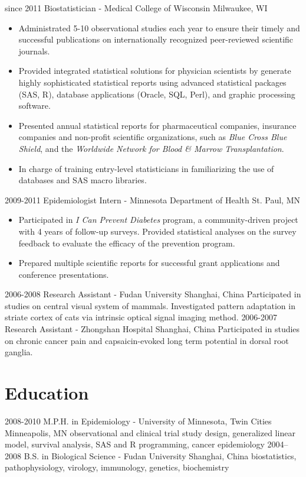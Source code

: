 \documentclass[11pt, print]{friggeri-cv}
\begin{document}
\begin{entrylist}
  \entry
    {since 2011}
    {Biostatistician - Medical College of Wisconsin}
    {Milwaukee, WI}
    {
    \vspace{-\baselineskip}
    \begin{itemize}
      \item Administrated 5-10 observational studies each year to ensure their timely and successful publications on internationally recognized peer-reviewed scientific journals.
      \item Provided integrated statistical solutions for physician scientists by generate highly sophisticated statistical reports using advanced statistical packages (SAS, R), database applications (Oracle, SQL, Perl), and graphic processing software.
      \item Presented annual statistical reports for pharmaceutical companies, insurance companies and non-profit scientific organizations, such as \textit{Blue Cross Blue Shield}, and the \textit{Worldwide Network for Blood \& Marrow Transplantation}.
      \item In charge of training entry-level statisticians in familiarizing the use of databases and SAS macro libraries.
    \end{itemize}
    }
  \entry
    {2009-2011}
    {Epidemiologist Intern - Minnesota Department of Health}
    {St. Paul, MN}
    {
    \vspace{-\baselineskip}
    \begin{itemize}
      \item Participated in \textit{I Can Prevent Diabetes} program, a community-driven project with 4 years of follow-up surveys. Provided statistical analyses on the survey feedback to evaluate the efficacy of the prevention program.
      \item Prepared multiple scientific reports for successful grant applications and conference presentations.
    \end{itemize}
    }
  \entry
    {2006-2008}
    {Research Assistant - Fudan University}
    {Shanghai, China}
    {Participated in studies on central visual system of mammals. Investigated pattern adaptation in striate cortex of cats via intrinsic optical signal imaging method.}
  \entry
    {2006-2007}
    {Research Assistant - Zhongshan Hospital}
    {Shanghai, China }
    {Participated in studies on chronic cancer pain and capsaicin-evoked long term potential in dorsal root ganglia.}
\end{entrylist}

\section{Education}

\begin{entrylist}
  \entry
    {2008-2010}
    {M.P.H. in Epidemiology - University of Minnesota, Twin Cities}
    {Minneapolis, MN}
    {observational and clinical trial study design, generalized linear model, survival analysis, SAS and R programming, cancer epidemiology}
  \entry
    {2004–2008}
    {B.S. in Biological Science - Fudan University}
    {Shanghai, China}
    {biostatistics, pathophysiology, virology, immunology, genetics, biochemistry}
\end{entrylist}
\end{document}
